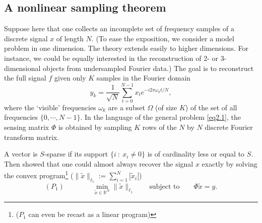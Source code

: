 \subsection{A nonlinear sampling theorem}
Suppose here that one collects an incomplete set of frequency samples of a discrete signal $x$ of length $N$. (To ease the exposition, we consider a model problem in one dimension. The theory extends easily to higher dimensions. For instance, we could be equally interested in the reconstruction of 2- or 3-dimensional objects from undersampled Fourier data.) The goal is to reconstruct the full signal $f$ given only $K$ samples in the Fourier domain
\begin{equation}
\label{eq2.2.2}
y_k=\dfrac{1}{\sqrt{N}}\sum\limits_{t=0}^{N-1}x_te^{-i2\pi\omega_kt/N},
\end{equation}
where the `visible' frequencies $\omega_k$ are a subset $\Omega$ (of size $K$) of the set of all frequencies $\{0,\cdots,N-1\}$. In the language of the general problem \cref{eq2.1}, the sensing matrix $\Phi$ is obtained by sampling $K$ rows of the $N$ by $N$ discrete Fourier transform matrix.

A vector is $S$-sparse if its support $\{i\ :\ x_i\neq 0\}$ is of cardinality less or equal to $S$. Then \cite{Candes2006} showed that one could almost always recover the signal $x$ exactly by solving the convex program\footnote{($P_1$ can even be recast as a linear program\cite{2-3,22})} ($\|\tilde{x}\|_{\ell_1}:=\sum_{i=1}^{N}|\tilde{x}_i|$)
\begin{equation}
\label{eq2.2.3}
(P_1) \qquad\qquad \min_{\tilde{x} \in \mathbb{R}^N}\| \tilde{x} \|_{\ell_1} \qquad \mbox{subject to} \qquad \Phi \tilde{x}=y.
\end{equation}

